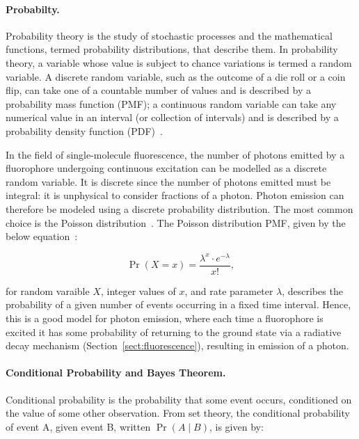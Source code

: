 \paragraph{Probabilty.}
Probability theory is the study of stochastic processes and the mathematical functions, termed probability distributions, that describe them. In probability theory, a variable whose value is subject to chance variations is termed a random variable. A discrete random variable, such as the outcome of a die roll or a coin flip, can take one of a countable number of values and is described by a probability mass function (PMF); a continuous random variable can take any numerical value in an interval (or collection of intervals) and is described by a probability density function (PDF)~\cite{Meester2003, Feller1968}. 

In the field of single-molecule fluorescence, the number of photons emitted by a fluorophore undergoing continuous excitation can be modelled as a discrete random variable. It is discrete since the number of photons emitted must be integral: it is unphysical to consider fractions of a photon. Photon emission can therefore be modeled using a discrete probability distribution. The most common choice is the Poisson distribution~\cite{chen1999}. The Poisson distribution PMF, given by the below equation~\cite{Meester2003}:

\begin{equation}
\Pr(X = x) = \frac{\lambda^x \cdot e^{-\lambda}}{x!},
\label{eq:poisson}
\end{equation}
 
for random varaible $X$, integer values of $x$, and rate parameter $\lambda$, describes the probability of a given number of events occurring in a fixed time interval. Hence, this is a good model for photon emission, where each time a fluorophore is excited it has some probability of returning to the ground state via a radiative decay mechanism (Section~\ref{sect:fluorescence}), resulting in emission of a photon. 



\paragraph{Conditional Probability and Bayes Theorem.}
Conditional probability is the probability that some event occurs, conditioned on the value of some other observation. From set theory, the conditional probability of event A, given event B, written $\Pr(A \mid B)$, is given by: 

